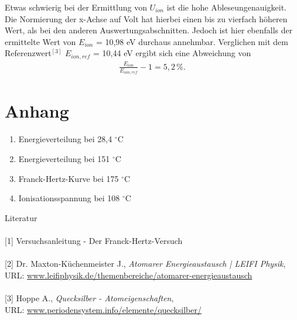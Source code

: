 Etwas schwierig bei der Ermittlung von $U_{ion}$ ist die hohe Ableseungenauigkeit. Die Normierung der x-Achse auf Volt hat hierbei
einen bis zu vierfach höheren Wert, als bei den anderen Auswertungsabschnitten. Jedoch ist hier ebenfalls der ermittelte Wert von
$E_{ion}$ = 10,98 eV durchaus annehmbar. Verglichen mit dem Referenzwert$^{[3]}$ $E_{ion,ref}$ = 10,44 eV ergibt sich eine Abweichung von
\begin{align}
 \frac{E_{ion}}{E_{ion,ref}}-1 = 5,2 \,\%.
\end{align}



\section{Anhang}
\label{sec_anhang}
\begin{enumerate}
 \item Energieverteilung bei 28,4 $^\circ$C
 \label{item_28}
 \item Energieverteilung bei 151 $^\circ$C
 \label{item_151}
 \item Franck-Hertz-Kurve bei 175 $^{\circ}$C 
 \label{item_franck}
 \item Ionisationsspannung bei 108 $^{\circ}$C
 \label{item_ion}
\end{enumerate}

 




\parskip 200pt
\Large{Literatur}\\\\
\large{[1] Versuchsanleitung - Der Franck-Hertz-Versuch}\\\\
\large{[2] Dr. Maxton-Küchenmeister J., \textit{Atomarer Energieaustausch | LEIFI Physik}, \\URL: \href{http://www.leifiphysik.de/themenbereiche/atomarer-energieaustausch/geschichte#Franck-Hertz\%20-\%20Historisches}{www.leifiphysik.de/themenbereiche/atomarer-energieaustausch}}\\\\
\large{[3] Hoppe A., \textit{Quecksilber - Atomeigenschaften}, \\URL: \href{http://www.periodensystem.info/elemente/quecksilber/}{www.periodensystem.info/elemente/quecksilber/}}\\\\





